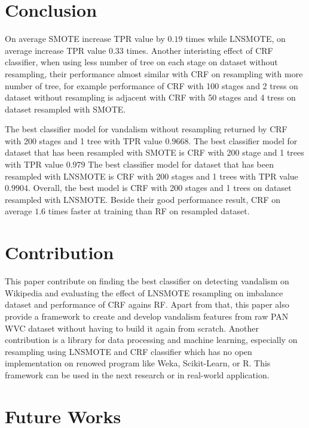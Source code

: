 \documentclass[conference,compsoc,a4paper,twocolumn,final]{IEEEtran}
\begin{document}





\section{Conclusion}
\label{section:conclusion}

On average SMOTE increase TPR value by $0.19$ times while LNSMOTE, on average
increase TPR value $0.33$ times.
Another interisting effect of CRF classifier, when using less number of tree on
each stage on dataset without resampling, their performance almost similar with
CRF on resampling with more number of tree, for example performance of CRF with
100 stages and 2 tress on dataset without resampling is adjacent with CRF with
50 stages and 4 tress on dataset resampled with SMOTE.

The best classifier model for vandalism without resampling returned by CRF with
200 stages and 1 tree with TPR value $0.9668$.
The best classifier model for dataset that has been resampled with SMOTE is CRF
with 200 stage and 1 trees with TPR value $0.979$
The best classifier model for dataset that has been resampled with LNSMOTE is
CRF with 200 stages and 1 trees with TPR value $0.9904$.
Overall, the best model is CRF with 200 stages and 1 trees on dataset resampled
with LNSMOTE.
Beside their good performance result, CRF on average $1.6$ times faster at
training than RF on resampled dataset.

\section{Contribution}

This paper contribute on finding the best classifier on detecting vandalism on
Wikipedia and evaluating the effect of LNSMOTE resampling on imbalance dataset
and performance of CRF agains RF.
Apart from that, this paper also provide a framework to create and develop
vandalism features from raw PAN WVC dataset without having to build it again
from scratch.
Another contribution is a library for data processing and machine learning,
especially on resampling using LNSMOTE and CRF classifier which has no
open implementation on renowed program like Weka, Scikit-Learn, or R.
This framework can be used in the next research or in real-world application.

\section{Future Works}
\end{document}
